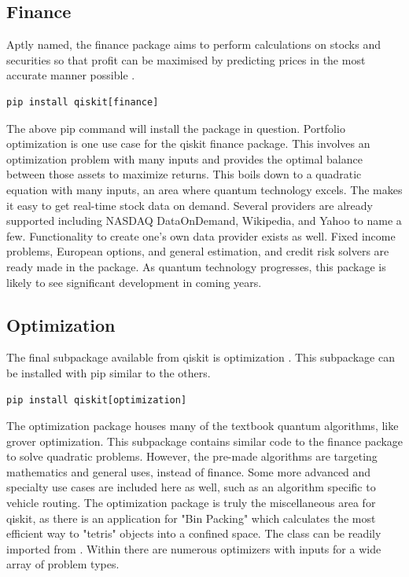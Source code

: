 \documentclass[conference]{IEEEtran}
\begin{document}
\subsection{Finance}
Aptly named, the finance package aims to perform calculations on stocks and securities so that profit can be maximised by predicting prices in the most accurate manner possible \cite{b14}.
\begin{verbatim}
pip install qiskit[finance]
\end{verbatim}
The above pip command will install the package in question. 
Portfolio optimization is one use case for the qiskit finance package. 
This involves an optimization problem with many inputs and provides the optimal balance between those assets to maximize returns. 
This boils down to a quadratic equation with many inputs, an area where quantum technology excels. 
The  makes it easy to get real-time stock data on demand.
Several providers are already supported including NASDAQ DataOnDemand, Wikipedia, and Yahoo to name a few. 
Functionality to create one's own data provider exists as well. 
Fixed income problems, European options, and general estimation, and credit risk solvers are ready made in the package. 
As quantum technology progresses, this package is likely to see significant development in coming years. 

\subsection{Optimization}
The final subpackage available from qiskit is optimization \cite{b12}. 
This subpackage can be installed with pip similar to the others. 
\begin{verbatim}
pip install qiskit[optimization]
\end{verbatim}
The optimization package houses many of the textbook quantum algorithms, like grover optimization. 
This subpackage contains similar code to the finance package to solve quadratic problems. 
However, the pre-made algorithms are targeting mathematics and general uses, instead of finance. 
Some more advanced and specialty use cases are included here as well, such as an algorithm specific to vehicle routing. 
The optimization package is truly the miscellaneous area for qiskit, as there is an application for "Bin Packing" which calculates the most efficient way to "tetris" objects into a confined space. 
The  class can be readily imported from .
Within  there are numerous optimizers with inputs for a wide array of problem types. 
\end{document}
